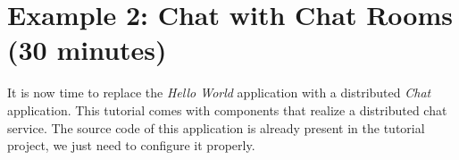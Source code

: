 %
% 
%
%
%

\section{Example 2: Chat with Chat Rooms (30 minutes)}
\label{sec:example_chat}

It is now time to replace the \emph{Hello World} application with a distributed \emph{Chat} application.
This tutorial comes with components that realize a distributed chat service.
The source code of this application is already present in the tutorial project,
we just need to configure it properly.


